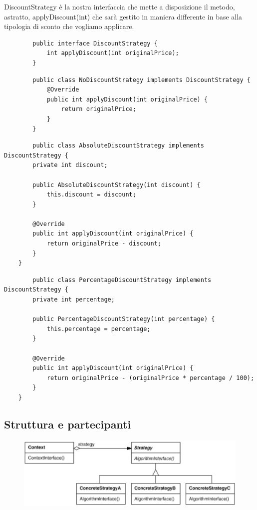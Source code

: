 DiscountStrategy è la nostra interfaccia che mette a disposizione il metodo, astratto, applyDiscount(int) che sarà gestito in maniera differente in base alla tipologia
di sconto che vogliamo applicare.

\begin{multicols}{2}
    \begin{lstlisting}
        public interface DiscountStrategy {
            int applyDiscount(int originalPrice);
        }
    \end{lstlisting}
\columnbreak
    \begin{lstlisting}
        public class NoDiscountStrategy implements DiscountStrategy {
            @Override
            public int applyDiscount(int originalPrice) {
                return originalPrice;
            }
        }
    \end{lstlisting}
\end{multicols}

\begin{multicols}{2}
    \begin{lstlisting}
        public class AbsoluteDiscountStrategy implements DiscountStrategy {
        private int discount;
        
        public AbsoluteDiscountStrategy(int discount) {
            this.discount = discount;
        }

        @Override
        public int applyDiscount(int originalPrice) {
            return originalPrice - discount;
        }
    }    
    \end{lstlisting}
\columnbreak
    \begin{lstlisting}
        public class PercentageDiscountStrategy implements DiscountStrategy {
        private int percentage;
        
        public PercentageDiscountStrategy(int percentage) {
            this.percentage = percentage;
        }

        @Override
        public int applyDiscount(int originalPrice) {
            return originalPrice - (originalPrice * percentage / 100);
        }
    }
    \end{lstlisting}
\end{multicols}

\subsection{Struttura e partecipanti}

\begin{figure}[H]
    \centering   
    \includegraphics[width=0.5\linewidth]{../../immagini/templateMethod_Strategy/struttura_strategy}    
\end{figure}


